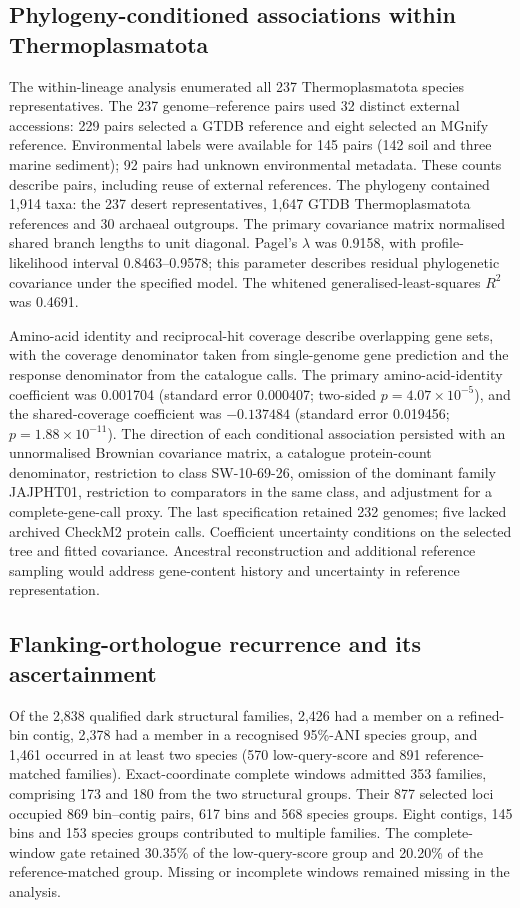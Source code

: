 \documentclass[11pt]{article}
\begin{document}
\subsection*{Phylogeny-conditioned associations within Thermoplasmatota}
The within-lineage analysis enumerated all 237 Thermoplasmatota species representatives.
The 237 genome--reference pairs used 32 distinct external accessions: 229 pairs selected a GTDB
reference and eight selected an MGnify reference. Environmental labels were available for 145
pairs (142 soil and three marine sediment); 92 pairs had unknown environmental metadata.
These counts describe pairs, including reuse of external references. The phylogeny contained
1{,}914 taxa: the 237 desert representatives, 1{,}647 GTDB Thermoplasmatota references and 30
archaeal outgroups. The primary covariance matrix normalised shared branch lengths to unit
diagonal. Pagel's $\lambda$ was 0.9158, with profile-likelihood interval 0.8463--0.9578;
this parameter describes residual phylogenetic covariance under the specified model.
The whitened generalised-least-squares $R^2$ was 0.4691.

Amino-acid identity and reciprocal-hit coverage describe overlapping gene sets, with the
coverage denominator taken from single-genome gene prediction and the response denominator
from the catalogue calls. The primary amino-acid-identity coefficient was 0.001704
(standard error 0.000407; two-sided $p=4.07\times10^{-5}$), and the shared-coverage coefficient
was $-0.137484$ (standard error 0.019456; $p=1.88\times10^{-11}$).
The direction of each conditional association persisted with an unnormalised Brownian
covariance matrix, a catalogue protein-count denominator, restriction to class SW-10-69-26,
omission of the dominant family JAJPHT01, restriction to comparators in the same class,
and adjustment for a complete-gene-call proxy. The last specification retained 232 genomes;
five lacked archived CheckM2 protein calls. Coefficient uncertainty conditions on the selected
tree and fitted covariance. Ancestral reconstruction and additional reference sampling would
address gene-content history and uncertainty in reference representation.

\subsection*{Flanking-orthologue recurrence and its ascertainment}
Of the 2{,}838 qualified dark structural families, 2{,}426 had a member on a refined-bin contig,
2{,}378 had a member in a recognised 95\%-ANI species group, and 1{,}461 occurred in at least
two species (570 low-query-score and 891 reference-matched families).
Exact-coordinate complete windows admitted 353 families, comprising 173 and 180 from the two
structural groups. Their 877 selected loci occupied 869 bin--contig pairs, 617 bins and 568
species groups. Eight contigs, 145 bins and 153 species groups contributed to multiple families.
The complete-window gate retained 30.35\% of the low-query-score group and 20.20\% of the
reference-matched group. Missing or incomplete windows remained missing in the analysis.
\end{document}
